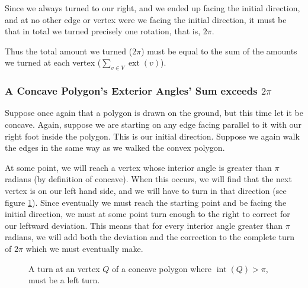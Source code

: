 \documentclass{article}
\newcommand{\inta}[1]{\operatorname{int}\left( #1 \right)} %
\newcommand{\exta}[1]{\operatorname{ext}\left( #1 \right)} %
\begin{document}
Since we always turned to our right, and we ended up facing the initial direction, and at no other edge or vertex were we facing the initial direction, it must be that in total we turned precisely one rotation, that is, \(2\pi\).

Thus the total amount we turned (\(2\pi\)) must be equal to the sum of the amounts we turned at each vertex (\(\sum_{v \in V}\exta{v}\)).

\subsubsection{A Concave Polygon's Exterior Angles' Sum exceeds \(2\pi\)}

Suppose once again that a polygon is drawn on the ground, but this time let it be concave. Again, suppose we are starting on any edge facing parallel to it with our right foot inside the polygon. This is our initial direction. Suppose we again walk the edges in the same way as we walked the convex polygon.

At some point, we will reach a vertex whose interior angle is greater than \(\pi\) radians (by definition of concave). When this occurs, we will find that the next vertex is on our left hand side, and we will have to turn in that direction (see figure \ref{walk-2}). Since eventually we must reach the starting point and be facing the initial direction, we must at some point turn enough to the right to correct for our leftward deviation. This means that for every interior angle greater than \(\pi\) radians, we will add both the deviation and the correction to the complete turn of \(2\pi\) which we must eventually make.

\begin{figure}
	\centering
	\caption{A turn at an vertex \(Q\) of a concave polygon where \(\inta{Q} > \pi\), must be a left turn.}
	\label{walk-2}
\end{figure}%
\end{document}
